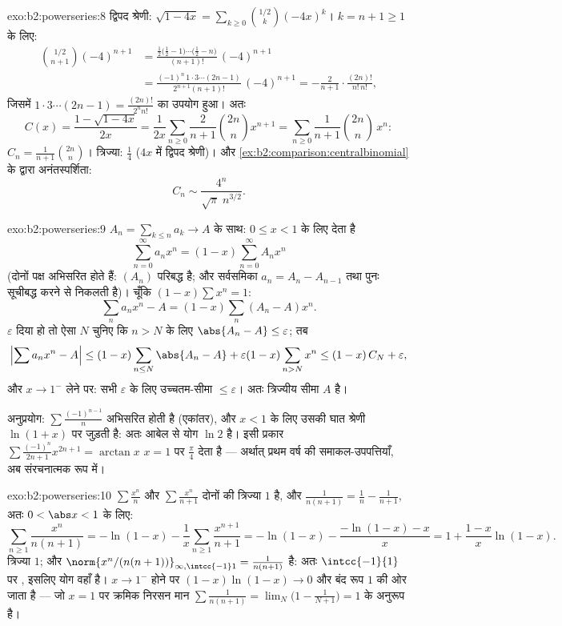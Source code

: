 \begin{solution}{exo:b2:powerseries:8}
द्विपद श्रेणी: $\sqrt{1-4x} = \sum_{k\geq0}
\binom{1/2}{k}(-4x)^k$। $k = n + 1 \geq 1$ के लिए:
\begin{align*}
\binom{1/2}{n+1}(-4)^{n+1}
&= \frac{\frac12\bigl(\frac12 - 1\bigr)\cdots\bigl(\frac12 -
n\bigr)}{(n+1)!}\,(-4)^{n+1}\\
&= \frac{(-1)^n\,1\cdot3\cdots(2n-1)}{2^{n+1}(n+1)!}\,(-4)^{n+1}
= -\frac{2}{n+1}\cdot\frac{(2n)!}{n!\,n!} ,
\end{align*}
जिसमें $1\cdot3\cdots(2n-1) = \frac{(2n)!}{2^n n!}$ का उपयोग हुआ। अतः
\[
C(x) = \frac{1 - \sqrt{1-4x}}{2x}
= \frac{1}{2x}\sum_{n\geq0}\frac{2}{n+1}\binom{2n}{n}x^{n+1}
= \sum_{n\geq0} \frac{1}{n+1}\binom{2n}{n}\,x^n :
\]
$C_n = \frac{1}{n+1}\binom{2n}{n}$। त्रिज्या: $\frac14$ ($4x$ में द्विपद श्रेणी)। और \cref{ex:b2:comparison:centralbinomial} के द्वारा
अनंतस्पर्शिता:
\[
C_n \sim \frac{4^n}{\sqrt{\pi}\; n^{3/2}} .
\]
\end{solution}

\begin{solution}{exo:b2:powerseries:9}
$A_n = \sum_{k \leq n} a_k \to A$ के साथ: $0 \leq x < 1$ के लिए  देता है
\[
\sum_{n=0}^{\infty} a_n x^n = (1 - x)\sum_{n=0}^{\infty} A_n x^n
\]
(दोनों पक्ष अभिसरित होते हैं: $(A_n)$ परिबद्ध है; और सर्वसमिका $a_n = A_n - A_{n-1}$ तथा पुनः
सूचीबद्ध करने से निकलती है)। चूँकि $(1 -
x)\sum x^n = 1$:
\[
\sum_n a_nx^n - A = (1-x)\sum_{n} (A_n - A)x^n .
\]
$\varepsilon$ दिया हो तो ऐसा $N$ चुनिए कि $n > N$ के लिए $\abs{A_n - A} \leq
\varepsilon$; तब
\[
\Bigl|\sum a_nx^n - A\Bigr|
\leq (1-x)\sum_{n \leq N}\abs{A_n - A} + \varepsilon(1 -
x)\sum_{n > N}x^n
\leq (1-x)\,C_N + \varepsilon ,
\]
और $x \to 1^-$ लेने पर: सभी $\varepsilon$ के लिए उच्चतम-सीमा $\leq \varepsilon$। अतः त्रिज्यीय सीमा
$A$ है।

अनुप्रयोग: $\sum \frac{(-1)^{n-1}}{n}$ अभिसरित होती है (एकांतर), और $x < 1$ के लिए उसकी घात श्रेणी
$\ln(1 + x)$ पर जुड़ती है: अतः आबेल से योग $\ln 2$ है। इसी प्रकार $\sum\frac{(-1)^n}{2n+1}x^{2n+1} =
\arctan x$ $x = 1$ पर $\frac\pi4$ देता
है --- अर्थात् प्रथम वर्ष की समाकल-उपपत्तियाँ, अब संरचनात्मक रूप में।
\end{solution}

\begin{solution}{exo:b2:powerseries:10}
$\sum\frac{x^n}{n}$ और $\sum\frac{x^n}{n+1}$ दोनों की त्रिज्या $1$ है, और $\frac{1}{n(n+1)} = \frac1n - \frac1{n+1}$, अतः $0
< \abs x < 1$ के लिए:
\[
\sum_{n\geq1}\frac{x^n}{n(n+1)}
= -\ln(1-x) - \frac1x\sum_{n\geq1}\frac{x^{n+1}}{n+1}
= -\ln(1-x) - \frac{-\ln(1-x) - x}{x}
= 1 + \frac{1-x}{x}\ln(1-x) .
\]
त्रिज्या $1$; और $\norm{x^n/(n(n+1))}_{\infty,\intcc{-1}1} =
\frac{1}{n(n+1)}$  है: अतः $\intcc{-1}{1}$ पर , इसलिए योग वहाँ
 है। $x \to
1^-$ होने पर $(1-x)\ln(1-x) \to 0$ और बंद रूप $1$ की ओर जाता है --- जो $x = 1$ पर
क्रमिक निरसन मान $\sum\frac{1}{n(n+1)} =
\lim_N\bigl(1 - \frac{1}{N+1}\bigr) = 1$ के अनुरूप है।
\end{solution}

